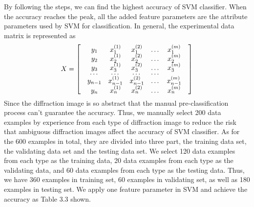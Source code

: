 By following the steps, we can find the highest accuracy of SVM classifier. When the accuracy reaches the peak, all the added feature parameters are the attribute parameters used by SVM for classification. In general, the experimental data matrix is represented as 
\begin{align*}
X = 
\renewcommand{\arraystretch}{0.5}
\begin{bmatrix}
 & y_1 & x_1^{(1)} & x_1^{(2)} & $\ldots$ & x_1^{(m)} & \\
 & y_2 & x_2^{(1)} & x_2^{(2)} & $\ldots$ & x_2^{(m)} &\\
 & y_3 & x_3^{(1)} & x_3^{(2)} & $\ldots$ & x_3^{(m)} &\\
 & $\ldots$ & $\ldots$ & $\ldots$ & $\ldots$\\
 & y_{n-1} & x_{n-1}^{(1)} & x_{n-1}^{(2)} & $\ldots$ & x_{n-1}^{(m)} &\\
 & y_n & x_n^{(1)} & x_n^{(2)} & $\ldots$ & x_n^{(m)} &\\
\end{bmatrix}
\end{align*}
Since the diffraction image is so abstract that the manual pre-classification process can't guarantee the accuracy. Thus, we manually select 200 data examples by experience from each type of diffraction image to reduce the risk that ambiguous diffraction images affect the accuracy of SVM classifier. As for the 600 examples in total, they are divided into three part, the training data set, the validating data set and the testing data set. We select 120 data examples from each type as the training data, 20 data examples from each type as the validating data, and 60 data examples from each type as the testing data. Thus, we have 360 examples in training set, 60 examples in validating set, as well as 180 examples in testing set. We apply one feature parameter in SVM and achieve the accuracy as Table 3.3 shown.  
